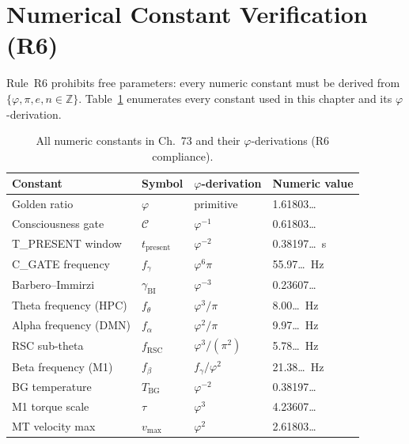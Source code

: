 \section{Numerical Constant Verification (R6)}
\label{sec:73:r6-verify}

Rule~R6 prohibits free parameters: every numeric constant must
be derived from $\{\varphi, \pi, e, n \in \mathbb{Z}\}$.
Table~\ref{tab:73:constants} enumerates every constant used in
this chapter and its $\varphi$-derivation.

\begin{table}[H]
\centering
\caption{All numeric constants in Ch.~73 and their $\varphi$-derivations (R6 compliance).}
\label{tab:73:constants}
\small
\begin{tabular}{llll}
\toprule
Constant & Symbol & $\varphi$-derivation & Numeric value \\
\midrule
Golden ratio          & $\varphi$               & primitive               & 1.61803\ldots \\
Consciousness gate    & $\mathcal{C}$           & $\varphi^{-1}$          & 0.61803\ldots \\
T\_PRESENT window     & $t_\mathrm{present}$    & $\varphi^{-2}$          & 0.38197\ldots\ s \\
C\_GATE frequency     & $f_\gamma$              & $\varphi^{6}\pi$        & 55.97\ldots\ Hz \\
Barbero--Immirzi      & $\gamma_\mathrm{BI}$   & $\varphi^{-3}$          & 0.23607\ldots \\
Theta frequency (HPC) & $f_\theta$              & $\varphi^{3}/\pi$       & 8.00\ldots\ Hz \\
Alpha frequency (DMN) & $f_\alpha$              & $\varphi^{2}/\pi$       & 9.97\ldots\ Hz \\
RSC sub-theta         & $f_\mathrm{RSC}$        & $\varphi^{3}/(\pi^{2})$ & 5.78\ldots\ Hz \\
Beta frequency (M1)   & $f_\beta$               & $f_\gamma/\varphi^2$    & 21.38\ldots\ Hz \\
BG temperature        & $T_\mathrm{BG}$         & $\varphi^{-2}$          & 0.38197\ldots \\
M1 torque scale       & $\tau$                  & $\varphi^{3}$           & 4.23607\ldots \\
MT velocity max       & $v_\max$                & $\varphi^{2}$           & 2.61803\ldots \\

\end{tabular}
\end{table}
